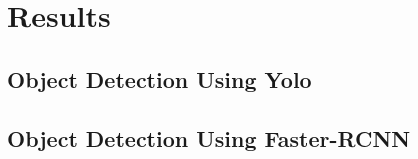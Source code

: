 \section{Results}

\subsection{Object Detection Using Yolo}



\subsection{Object Detection Using Faster-RCNN}